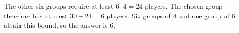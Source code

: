 The other six groups require at least $6\cdot4=24$ players. The chosen group therefore has at most $30-24=6$ players. Six groups of 4 and one group of 6 attain this bound, so the answer is $\boxed{6}$.
